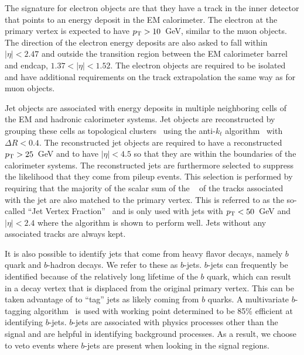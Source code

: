The signature for electron objects are that they have a track in the inner
detector that points to an energy deposit in the EM calorimeter.
The electron at the primary vertex is expected to have $p_{\mathrm{T}}>10$~GeV, similar
to the muon objects. The direction of the electron energy 
deposits are also asked to fall within $|\eta| < 2.47$ and outside the 
transition region between the EM calorimeter barrel and endcap, $1.37 < |\eta| < 1.52$.
The electron objects are required to be isolated and have additional
requirements on the track extrapolation the same way as for muon objects.  


Jet objects are associated with energy deposits in multiple 
neighboring cells of the EM and hadronic calorimeter systems.
Jet objects are reconstructed by grouping these cells
as topological clusters~\cite{Lampl:1099735}
using the anti-$k_t$ algorithm~\cite{Cacciari:2008gp} with $\Delta R < 0.4$.
The reconstructed jet objects are required to have a reconstructed
$p_{\mathrm{T}}>25$~GeV and to have $|\eta|<4.5$ so that
they are within the boundaries of the calorimeter systems.
The reconstructed jets are furthermore selected to suppress the likelihood that
they come from pileup events. This selection is performed by 
requiring that the majority of the
scalar sum of the \pt~ of the tracks associated with the 
jet are also matched to the primary vertex. This is referred to
as the so-called ``Jet Vertex Fraction''~\cite{Miller:1206864, ATLAS-CONF-2013-083}
and is only used with jets with $p_{\mathrm{T}} < 50$~GeV and $|\eta|<2.4$ where
the algorithm is shown to perform well. Jets without any associated
tracks are always kept. 

It is also possible to identify jets that come from heavy flavor
decays, namely $b$ quark and $b$-hadron decays. We refer
to these as $b$-jets. $b$-jets can frequently be identified 
because of the relatively long lifetime of the $b$ quark, which can 
result in a decay vertex that is displaced from the original primary vertex.
This can be taken advantage of to ``tag'' jets as likely coming from
$b$ quarks. A multivariate $b$-tagging algorithm~\cite{ATLAS-CONF-2014-004}
is used with working point determined to be 85\% efficient at
identifying $b$-jets. %
$b$-jets are associated with physics processes other than the signal
and are helpful in identifying background processes.
As a result, we choose to veto events where 
$b$-jets are present when looking in the signal regions.


